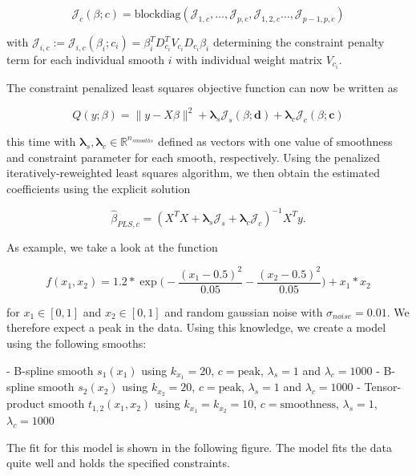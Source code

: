 \documentclass[10pt,a4paper]{article}
\begin{document}
	$$\mathcal J_c(\beta; c) = \text{blockdiag}(\mathcal J_{1,c}, \dots, \mathcal J_{p,c}, \mathcal J_{1,2,c} \dots, \mathcal J_{p-1,p,c})$$
	
	with $\mathcal J_{i,c} := \mathcal J_{i,c}(\beta_i; c_i) = \beta_i^T D_{c_i}^T V_{c_i} D_{c_i} \beta_i$ determining the constraint penalty term for each individual smooth $i$ with individual weight matrix $V_{c_i}$. 
	
	The constraint penalized least squares objective function can now be written as
	
	$$Q(y; \beta) = \lVert y - X\beta \rVert^2 + \boldsymbol \lambda_s \mathcal J_s(\beta; \boldsymbol d) + \boldsymbol \lambda_c \mathcal J_c(\beta; \boldsymbol c) $$
	
	this time with $\boldsymbol \lambda_s, \boldsymbol \lambda_c \in \mathbb{R}^{n_{smooths}}$  defined as vectors with one value of smoothness and constraint parameter for each smooth, respectively. Using the penalized iteratively-reweighted least squares algorithm, we then obtain the estimated coefficients using the explicit solution
	
	$$\hat \beta_{PLS,c} = (X^TX + \boldsymbol \lambda_s \mathcal J_s  + \boldsymbol \lambda_c \mathcal J_c)^{-1} X^T y.$$
	
	As example, we take a look at the function 
	
	$$f(x_1, x_2) = 1.2*\exp{\big(-\frac{(x_1 - 0.5)^2}{0.05} - \frac{(x_2 - 0.5)^2}{0.05}\big)} + x_1*x_2$$
	
	for $x_1 \in [0,1]$ and $x_2 \in [0,1]$ and random gaussian noise with $\sigma_{noise} = 0.01$. We therefore expect a peak in the data. Using this knowledge, we create a model using the following smooths:
	
	\begin{list}{label}{}
	- B-spline smooth $s_1(x_1)$ using $k_{x_1} = 20$, $c = \text{peak}$, $\lambda_s = 1$ and $\lambda_c = 1000$
	- B-spline smooth $s_2(x_2)$ using $k_{x_2} = 20$, $c = \text{peak}$, $\lambda_s = 1$ and $\lambda_c = 1000$
	- Tensor-product smooth $t_{1,2}(x_1, x_2)$ using $k_{x_1} = k_{x_2} = 10$, $c = \text{smoothness}$, $\lambda_s = 1$, $\lambda_c=1000$	
	\end{list}
		
	The fit for this model is shown in the following figure. The model fits the data quite well and holds the specified constraints.
		
\end{document}
